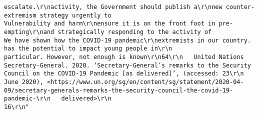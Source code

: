 \documentclass[
]{book}
\begin{document}
\begin{verbatim}
escalate.\r\nactivity, the Government should publish a\r\nnew counter-extremism strategy urgently to                                    Vulnerability and harm\r\nensure it is on the front foot in pre-empting\r\nand strategically responding to the activity of                               We have shown how the COVID-19 pandemic\r\nextremists in our country.                                                    has the potential to impact young people in\r\n                                                                              particular. However, not enough is known\r\n64\r\n   United Nations Secretary-General. 2020. ‘Secretary-General’s remarks to the Security Council on the COVID-19 Pandemic [as delivered]’, (accessed: 23\r\n   June 2020), <https://www.un.org/sg/en/content/sg/statement/2020-04-09/secretary-generals-remarks-the-security-council-the-covid-19-pandemic-\r\n   delivered>\r\n                                                                           16\r\n"                                                                                                                                                                                                                                                                                                                                                                                                                                                                                                                                                                                                                                                                                                                                                                                                                                                                                                                                                                                                                                                                                                                                                                                                                                                                                                                                                                                                                                                                                                                                                                                                                                                                                                                                                                        

\end{verbatim}
\end{document}
